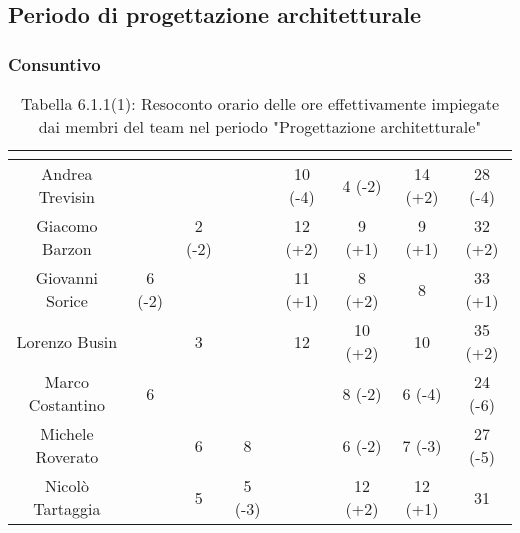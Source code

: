 \subsection{Periodo di progettazione architetturale}
\subsubsection{Consuntivo}
\renewcommand{\arraystretch}{1.5}
\begin{table}[H]
\begin{center}
\begin{tabular}{|c|c|c|c|c|c|c|c|}
\hline
\rowcolor{title_row}
\textbf{\color{title_text}{Nome}} & \textbf{\color{title_text}{Resp.}} & \textbf{\color{title_text}{Ammi.}} & \textbf{\color{title_text}{Analist.}} & \textbf{\color{title_text}{Progett.}} & \textbf{\color{title_text}{Program.}} & \textbf{\color{title_text}{Verific.}} & \textbf{\color{title_text}{Totale}} \\ \hline
Andrea Trevisin  & & & & 10 (-4) & 4 (-2) & 14 (+2) & 28 (-4) \\ \hline     %
Giacomo Barzon   & & 2 (-2) & & 12 (+2) & 9 (+1) & 9 (+1) & 32 (+2)  \\ \hline
Giovanni Sorice  & 6 (-2) & & & 11 (+1) & 8 (+2) & 8 & 33 (+1)  \\ \hline
Lorenzo Busin    & & 3 & & 12 & 10 (+2) & 10 & 35 (+2) \\ \hline
Marco Costantino & 6 & & & & 8 (-2) & 6 (-4) & 24 (-6) \\ \hline     %
Michele Roverato & & 6 & 8 & & 6 (-2) & 7 (-3) & 27 (-5) \\ \hline    %
Nicolò Tartaggia & & 5 & 5 (-3) & & 12 (+2) & 12 (+1) & 31  \\ \hline
\end{tabular}
\caption{Tabella 6.1.1(1): Resoconto orario delle ore effettivamente impiegate dai membri del team nel periodo "Progettazione architetturale"\label{}}
\end{center}
\end{table}
\renewcommand{\arraystretch}{1}

